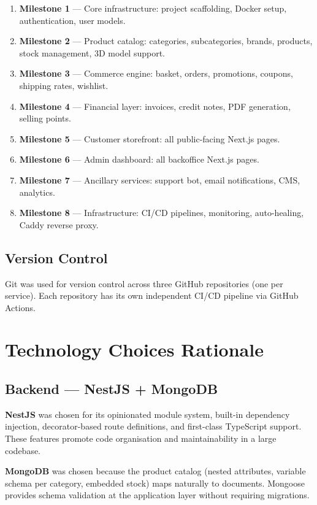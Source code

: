 \begin{enumerate}
    \item \textbf{Milestone 1} — Core infrastructure: project scaffolding, Docker setup, authentication, user models.
    \item \textbf{Milestone 2} — Product catalog: categories, subcategories, brands, products, stock management, 3D model support.
    \item \textbf{Milestone 3} — Commerce engine: basket, orders, promotions, coupons, shipping rates, wishlist.
    \item \textbf{Milestone 4} — Financial layer: invoices, credit notes, PDF generation, selling points.
    \item \textbf{Milestone 5} — Customer storefront: all public-facing Next.js pages.
    \item \textbf{Milestone 6} — Admin dashboard: all backoffice Next.js pages.
    \item \textbf{Milestone 7} — Ancillary services: support bot, email notifications, CMS, analytics.
    \item \textbf{Milestone 8} — Infrastructure: CI/CD pipelines, monitoring, auto-healing, Caddy reverse proxy.
\end{enumerate}

\subsection{Version Control}

Git was used for version control across three GitHub repositories (one per service).
Each repository has its own independent CI/CD pipeline via GitHub Actions.

\section{Technology Choices Rationale}

\subsection{Backend — NestJS + MongoDB}

\textbf{NestJS} was chosen for its opinionated module system, built-in dependency
injection, decorator-based route definitions, and first-class TypeScript support.
These features promote code organisation and maintainability in a large codebase.

\textbf{MongoDB} was chosen because the product catalog (nested attributes, variable
schema per category, embedded stock) maps naturally to documents. Mongoose provides
schema validation at the application layer without requiring migrations.

